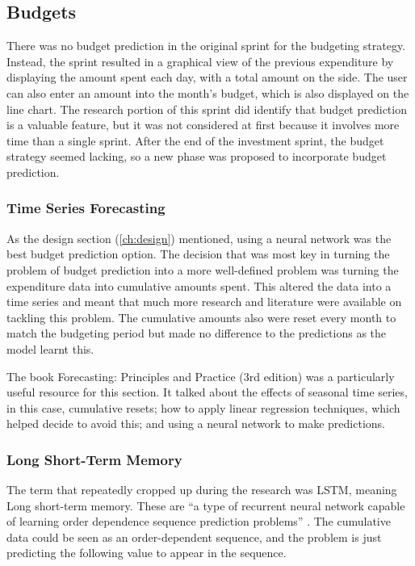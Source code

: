 \subsection{Budgets}
\label{sec:budgets}
There was no budget prediction in the original sprint for the budgeting strategy. Instead, the sprint resulted in a graphical view of the previous expenditure by displaying the amount spent each day, with a total amount on the side. The user can also enter an amount into the month's budget, which is also displayed on the line chart. The research portion of this sprint did identify that budget prediction is a valuable feature, but it was not considered at first because it involves more time than a single sprint. After the end of the investment sprint, the budget strategy seemed lacking, so a new phase was proposed to incorporate budget prediction.

\subsubsection{Time Series Forecasting}
As the design section (\ref{ch:design}) mentioned, using a neural network was the best budget prediction option. The decision that was most key in turning the problem of budget prediction into a more well-defined problem was turning the expenditure data into cumulative amounts spent. This altered the data into a time series and meant that much more research and literature were available on tackling this problem. The cumulative amounts also were reset every month to match the budgeting period but made no difference to the predictions as the model learnt this.

The book Forecasting: Principles and Practice (3rd edition) \cite{ForecastingPrinciplesPractice} was a particularly useful resource for this section. It talked about the effects of seasonal time series, in this case, cumulative resets; how to apply linear regression techniques, which helped decide to avoid this; and using a neural network to make predictions.

\subsubsection{Long Short-Term Memory}
The term that repeatedly cropped up during the research was LSTM, meaning Long short-term memory. These are ``a type of recurrent neural network capable of learning order dependence sequence prediction problems'' \cite{LSTMGentleIntro}. The cumulative data could be seen as an order-dependent sequence, and the problem is just predicting the following value to appear in the sequence.

